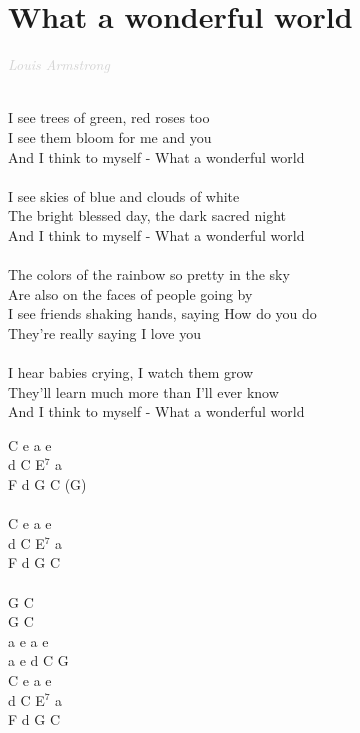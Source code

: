 \documentclass[a5paper, 10pt]{book}
\begin{document}
\section{What a wonderful world}\textcolor{lightgray}{\textit{Louis Armstrong}}\\~\\
\begin{minipage}[t]{0.8\textwidth}
  I see trees of green, red roses too\\
  I see them bloom for me and you\\
  And I think to myself - What a wonderful world \\
  \\
  I see skies of blue and clouds of white\\
  The bright blessed day, the dark sacred night\\
  And I think to myself - What a wonderful world\\
  \\
  \hspace*{5mm}The colors of the rainbow so pretty in the sky\\
  \hspace*{5mm}Are also on the faces of people going by\\
  \hspace*{5mm}I see friends shaking hands, saying How do you do \\
  \hspace*{5mm}They're really saying I love you \\
  \\
  I hear babies crying, I watch them grow\\
  They'll learn much more than I'll ever know\\
  And I think to myself - What a wonderful world\\
\end{minipage}
\begin{minipage}[t]{0.2\textwidth}
  C e a e\\
  d C E$^7$ a\\
  F d G C (G)\\
  \\
  C e a e\\
  d C E$^7$ a\\
  F d G C\\
  \\
  G C\\
  G C\\
  a e a e\\
  a e d C G\\

  C e a e\\
  d C E$^7$ a\\
  F d G C\\
\end{minipage}
\end{document}

